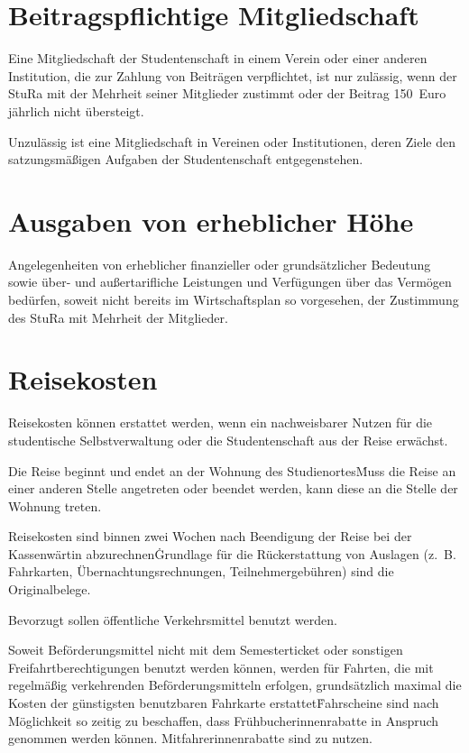 \section{Beitragspflichtige Mitgliedschaft}

\Abs \Satz Eine Mitgliedschaft der Studentenschaft in einem Verein oder einer anderen Institution, die zur Zahlung von Beiträgen verpflichtet, ist nur zulässig, wenn der StuRa mit der Mehrheit seiner Mitglieder zustimmt oder der Beitrag 150~Euro jährlich nicht übersteigt.

\Abs \Satz Unzulässig ist eine Mitgliedschaft in Vereinen oder Institutionen, deren Ziele den satzungsmäßigen Aufgaben der Studentenschaft entgegenstehen.



\section{Ausgaben von erheblicher Höhe}

\Abs \Satz Angelegenheiten von erheblicher finanzieller oder grundsätzlicher Bedeutung sowie über- und außertarifliche Leistungen und Verfügungen über das Vermögen bedürfen, soweit nicht bereits im Wirtschaftsplan so vorgesehen, der Zustimmung des StuRa mit Mehrheit der Mitglieder.



\section{Reisekosten}

\Abs \Satz Reisekosten können erstattet werden, wenn ein nachweisbarer Nutzen für die studentische Selbstverwaltung oder die Studentenschaft aus der Reise erwächst.

\Abs \Satz Die Reise beginnt und endet an der Wohnung des Studienortes\. Muss die Reise an einer anderen Stelle angetreten oder beendet werden, kann diese an die Stelle der Wohnung treten.

\Abs \Satz Reisekosten sind binnen zwei Wochen nach Beendigung der Reise bei der Kassenwärtin abzurechnen\. Grundlage für die Rückerstattung von Auslagen (z.~B. Fahrkarten, Übernachtungsrechnungen, Teilnehmergebühren) sind die Originalbelege.

\Abs \Satz Bevorzugt sollen öffentliche Verkehrsmittel benutzt werden.

\Abs \Satz Soweit Beförderungsmittel nicht mit dem Semesterticket oder sonstigen Freifahrtberechtigungen benutzt werden können, werden für Fahrten, die mit regelmäßig verkehrenden Beförderungsmitteln erfolgen, grundsätzlich maximal die Kosten der günstigsten benutzbaren Fahrkarte erstattet\. Fahrscheine sind nach Möglichkeit so zeitig zu beschaffen, dass Frühbucherinnenrabatte in Anspruch genommen werden können. Mitfahrerinnenrabatte sind zu nutzen.

